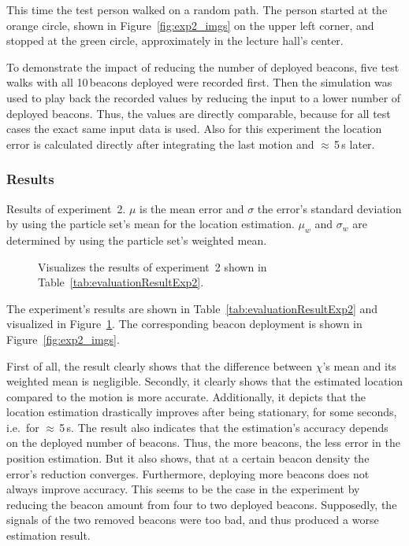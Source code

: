 This time the test person walked on a random path. The person started at the orange circle, shown in Figure~\ref{fig:exp2_imgs} on the upper left corner, and stopped at the green circle, approximately in the lecture hall's center.

To demonstrate the impact of reducing the number of deployed beacons, five test walks with all 10\,beacons deployed were recorded first. Then the simulation was used to play back the recorded values by reducing the input to a lower number of deployed beacons. Thus, the values are directly comparable, because for all test cases the exact same input data is used. Also for this experiment the location error is calculated directly after integrating the last motion and $\approx$\,5\,s later.

\subsubsection*{Results}
\begin{table}
	
	\caption{Results of experiment~2. $\mu$ is the mean error and $\sigma$ the error's standard deviation by using the particle set's mean for the location estimation. $\mu_w$ and $\sigma_w$ are determined by using the particle set's weighted mean.}
	\label{tab:evaluationResultExp2}
\end{table}

\begin{figure}
	
	\caption{Visualizes the results of experiment~2 shown in Table~\ref{tab:evaluationResultExp2}.}
	\label{fig:exp2_visualization}
\end{figure}

The experiment's results are shown in Table~\ref{tab:evaluationResultExp2} and visualized in Figure~\ref{fig:exp2_visualization}. The corresponding beacon deployment is shown in Figure~\ref{fig:exp2_imgs}.

First of all, the result clearly shows that the difference between $\chi$'s mean and its weighted mean is negligible.
Secondly, it clearly shows that the estimated location compared to the motion is more accurate. Additionally, it depicts that the location estimation drastically improves after being stationary, for some seconds, i.e.\ for $\approx$\,5\,s.
The result also indicates that the estimation's accuracy depends on the deployed number of beacons. Thus, the more beacons, the less error in the position estimation. But it also shows, that at a certain beacon density the error's reduction converges. Furthermore, deploying more beacons does not always improve accuracy. This seems to be the case in the experiment by reducing the beacon amount from four to two deployed beacons. Supposedly, the signals of the two removed beacons were too bad, and thus produced a worse estimation result.

